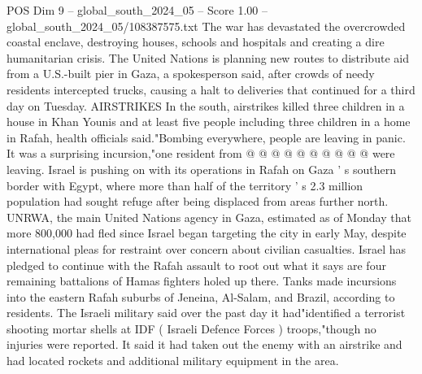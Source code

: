 \begin{textsample}{POS Dim 9 – global\_south\_2024\_05 – Score 1.00 – global\_south\_2024\_05/108387575.txt}
The war has devastated the overcrowded coastal enclave, destroying houses, schools and hospitals and creating a dire humanitarian crisis.
The United Nations is planning new routes to distribute aid from a U.S.-built pier in Gaza, a spokesperson said, after crowds of needy residents intercepted trucks, causing a halt to deliveries that continued for a third day on Tuesday.
AIRSTRIKES In the south, airstrikes killed three children in a house in Khan Younis and at least five people including three children in a home in Rafah, health officials said."Bombing everywhere, people are leaving in panic.
It was a surprising incursion,"one resident from @ @ @ @ @ @ @ @ @ @ were leaving.
Israel is pushing on with its operations in Rafah on Gaza ' s southern border with Egypt, where more than half of the territory ' s 2.3 million population had sought refuge after being displaced from areas further north.
UNRWA, the main United Nations agency in Gaza, estimated as of Monday that more 800,000 had fled since Israel began targeting the city in early May, despite international pleas for restraint over concern about civilian casualties.
Israel has pledged to continue with the Rafah assault to root out what it says are four remaining battalions of Hamas fighters holed up there.
Tanks made incursions into the eastern Rafah suburbs of Jeneina, Al-Salam, and Brazil, according to residents.
The Israeli military said over the past day it had"identified a terrorist shooting mortar shells at IDF ( Israeli Defence Forces ) troops,"though no injuries were reported.
It said it had taken out the enemy with an airstrike and had located rockets and additional military equipment in the area.

\end{textsample}
